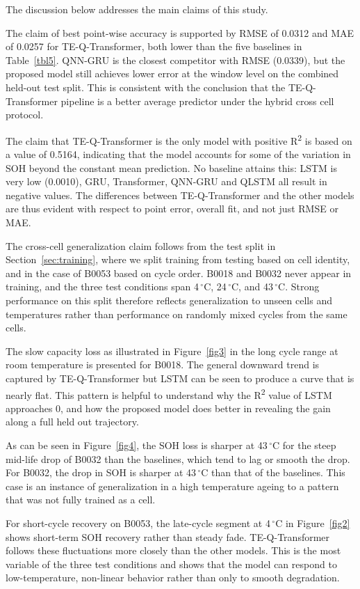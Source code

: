 \documentclass[a4paper,fleqn]{cas-sc}
\begin{document}
The discussion below addresses the main claims of this study.

The claim of best point-wise accuracy is supported by RMSE of 0.0312 and MAE of 0.0257 for TE-Q-Transformer, both lower than the five baselines in Table~\ref{tbl5}. QNN-GRU is the closest competitor with RMSE (0.0339), but the proposed model still achieves lower error at the window level on the combined held-out test split. This is consistent with the conclusion that the TE-Q-Transformer pipeline is a better average predictor under the hybrid cross cell protocol.

The claim that TE-Q-Transformer is the only model with positive R\textsuperscript{2} is based on a value of 0.5164, indicating that the model accounts for some of the variation in SOH beyond the constant mean prediction. No baseline attains this: LSTM is very low (0.0010), GRU, Transformer, QNN-GRU and QLSTM all result in negative values. The differences between TE-Q-Transformer and the other models are thus evident with respect to point error, overall fit, and not just RMSE or MAE.

The cross-cell generalization claim follows from the test split in Section~\ref{sec:training}, where we split training from testing based on cell identity, and in the case of B0053 based on cycle order. B0018 and B0032 never appear in training, and the three test conditions span 4\,$^\circ$C, 24\,$^\circ$C, and 43\,$^\circ$C. Strong performance on this split therefore reflects generalization to unseen cells and temperatures rather than performance on randomly mixed cycles from the same cells.

The slow capacity loss as illustrated in Figure~\ref{fig3} in the long cycle range at room temperature is presented for B0018. The general downward trend is captured by TE-Q-Transformer but LSTM can be seen to produce a curve that is nearly flat. This pattern is helpful to understand why the R\textsuperscript{2} value of LSTM approaches 0, and how the proposed model does better in revealing the gain along a full held out trajectory.

As can be seen in Figure~\ref{fig4}, the SOH loss is sharper at 43\,$^\circ$C for the steep mid-life drop of B0032 than the baselines, which tend to lag or smooth the drop. For B0032, the drop in SOH is sharper at 43\,$^\circ$C than that of the baselines. This case is an instance of generalization in a high temperature ageing to a pattern that was not fully trained as a cell.

For short-cycle recovery on B0053, the late-cycle segment at 4\,$^\circ$C in Figure~\ref{fig2} shows short-term SOH recovery rather than steady fade. TE-Q-Transformer follows these fluctuations more closely than the other models. This is the most variable of the three test conditions and shows that the model can respond to low-temperature, non-linear behavior rather than only to smooth degradation.
\end{document}
